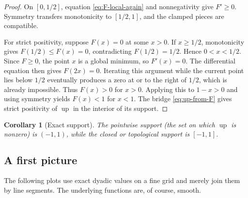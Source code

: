 \documentclass[11pt,oneside]{article}
\newtheorem{corollary}[theorem]{Corollary}
\theoremstyle{definition}
\theoremstyle{remark}
\newcommand{\upf}{\operatorname{up}}
\begin{document}
\begin{proof}
On $[0,1/2]$, equation \eqref{eq:F-local-again} and nonnegativity give $F'\ge0$.
Symmetry transfers monotonicity to $[1/2,1]$, and the clamped pieces are compatible.

For strict positivity, suppose $F(x)=0$ at some $x>0$.  If $x\ge1/2$,
monotonicity gives $F(1/2)\le F(x)=0$, contradicting
$F(1/2)=1/2$.  Hence $0<x<1/2$.  Since $F\ge0$, the point $x$ is a global
minimum, so $F'(x)=0$.  The differential equation then gives $F(2x)=0$.
Iterating this argument while the current point lies below $1/2$ eventually
produces a zero at or to the right of $1/2$, which is already impossible.  Thus
$F(x)>0$ for $x>0$.  Applying this to $1-x>0$ and using symmetry yields
$F(x)<1$ for $x<1$.  The bridge \eqref{eq:up-from-F} gives strict positivity of
$\upf$ in the interior of its support.
\end{proof}

\begin{corollary}[Exact support]\label{cor:up-exact-support}
The pointwise support (the set on which $\upf$ is nonzero) is $(-1,1)$, while
the closed or topological support is $[-1,1]$.
\end{corollary}

\subsection{A first picture}

The following plots use exact dyadic values on a fine grid and merely join them by
line segments.  The underlying functions are, of course, smooth.
\end{document}
